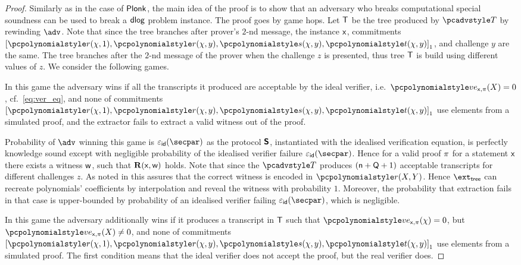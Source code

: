 \begin{proof}
	Similarly as in the case of $\textnormal{\textsf{Plonk}}$, the main idea of the proof is to show that an
  adversary who breaks computational special soundness can be used to break a $\mathsf{dlog}$
  problem instance. The proof goes by game hops. Let $\mathsf{T}$ be the tree produced by
  $\tdv$ by rewinding $\adv$. Note that since the tree branches after prover's $2$-nd
  message, the instance $\mathsf{x}$, commitments
  $\gone{\p{r} (\chi, 1), \p{r} (\chi, y), \p{s} (\chi, y), \p{t} (\chi, y)}$, and
  challenge $y$ are the same. The tree branches after the $2$-nd message of the
  prover when the challenge $z$ is presented, thus tree $\mathsf{T}$ is build using
  different values of $z$.
	We consider the following games.
	
	 In this game the adversary wins if all the transcripts it
	produced are acceptable by the ideal verifier,
	i.e.~$\vereq_{\inp, \zkproof}(X) = 0$, cf.~\cref{eq:ver_eq}, and none of
	commitments
	$\gone{\p{r} (\chi, 1), \p{r} (\chi, y), \p{s} (\chi, y), \p{t} (\chi, y)}$ use
	elements from a simulated proof, and the extractor fails to extract a valid
	witness out of the proof.
	
	 Probability of
	$\adv$ winning this game is $\epsid(\secpar)$ as the protocol $\bm{\mathsf{S}}$,
	instantiated with the idealised verification equation, is perfectly
	knowledge sound except with negligible probability of the idealised verifier
	failure $\epsid(\secpar)$. Hence for a valid proof $\pi$ for a
	statement $\mathsf{x}$ there exists a witness $\mathsf{w}$, such that $\mathbf{R}(\mathsf{x}, \mathsf{w})$
	holds. Note that since the $\tdv$ produces $(\mathsf{n} + \mathsf{Q} + 1)$
	acceptable transcripts for different challenges $z$. As noted in
	\cite{CCS:MBKM19} this assures that the correct witness is encoded in
	$\p{r} (X, Y)$. Hence $\extt$ can recreate polynomials' coefficients by
	interpolation and reveal the witness with probability $1$. Moreover, the
	probability that extraction fails in that case is upper-bounded by
	probability of an idealised verifier failing $\epsid(\secpar)$, which is
	negligible.
	
	 In this game the adversary additionally wins if it produces a
	transcript in $\mathsf{T}$ such that $\vereq_{\inp, \zkproof}(\chi) = 0$, but
	$\vereq_{\inp, \zkproof}(X) \neq 0$, and none of commitments
	$\gone{\p{r} (\chi, 1), \p{r} (\chi, y), \p{s} (\chi, y), \p{t} (\chi, y)}$
	use elements from a simulated proof.  The first condition means that the
	ideal verifier does not accept the proof, but the real verifier does.
	

\end{proof}
